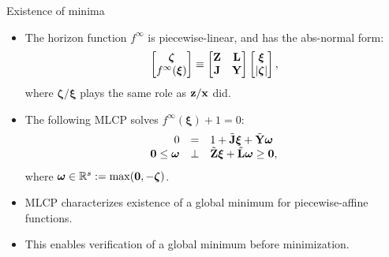 \documentclass[10pt]{beamer}
\begin{document}
\begin{frame}{Existence of minima}
{\begin{itemize}
    \item The horizon function $f^\infty$ is piecewise-linear, and has the abs-normal form:
    \[
    \begin{bmatrix}
      \bm\zeta \\ f^\infty(\bm\xi)
    \end{bmatrix}
    \equiv
    \begin{bmatrix}
      \mathbf{Z} & \mathbf{L} \\ \mathbf{J} & \mathbf{Y}
    \end{bmatrix}
    \begin{bmatrix}
      \bm\xi \\ |\bm\zeta|
    \end{bmatrix},
    \]
    where $\bm\zeta/\bm\xi$ plays the same role as $\mathbf{z}/\mathbf{x}$ did.
    \item The following MLCP solves $f^\infty(\bm\xi) + 1 = 0$:   
    \[
    \begin{array}{rcl}
    0 &=& 1 + \tilde{\mathbf{J}}\bm\xi + \tilde{\mathbf{Y}}\bm\omega \\
    \mathbf{0} \leq \bm\omega &\perp & \tilde{\mathbf{Z}}\bm\xi + \tilde{\mathbf{L}}\bm\omega \ge \mathbf{0},
    \end{array}
    \]
    where $\bm\omega \in \mathbb{R}^s:= \max(\mathbf{0},-\bm\zeta)$.
    \item MLCP characterizes existence of a global minimum for piecewise-affine functions.
    \item This enables verification of a global minimum before minimization.
\end{itemize}

}

\end{frame}
\end{document}
